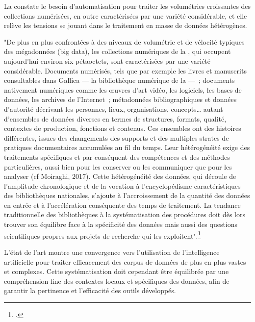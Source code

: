 La \bnf constate le besoin d'automatisation pour traiter les volumétries
croissantes des collections numérisées, en outre caractérisées par une
variété considérable, et elle relève les tensions se jouant dans le traitement en
masse de données hétérogènes.

\begin{kwote}

"De plus en plus confrontées à des niveaux de volumétrie et de vélocité
typiques des mégadonnées (big data), les collections numériques de la
\bnf, qui occupent aujourd'hui environ six pétaoctets, sont caractérisées
par une variété considérable. Documents numérisés, tels que par exemple
les livres et manuscrits consultables dans Gallica --- la bibliothèque
numérique de la \bnf ---~; documents nativement numériques comme les
œuvres d'art vidéo, les logiciels, les bases de données, les archives de
l'Internet~; métadonnées bibliographiques et données d'autorité
décrivant les personnes, lieux, organisations, concepts\ldots{} autant
d'ensembles de données diverses en termes de structures, formats,
qualité, contextes de production, fonctions et contenus. Ces ensembles
ont des histoires différentes, issues des changements des supports et
des multiples strates de pratiques documentaires accumulées au fil du
temps. Leur hétérogénéité exige des traitements spécifiques et par
conséquent des compétences et des méthodes particulières, aussi bien
pour les conserver ou les communiquer que pour les analyser (cf
Moiraghi, 2017). Cette hétérogénéité des données, qui découle de
l'amplitude chronologique et de la vocation à l'encyclopédisme
caractéristiques des bibliothèques nationales, s'ajoute à
l'accroissement de la quantité des données en entrée et à l'accélération
conséquente des temps de traitement. La tendance traditionnelle des
bibliothèques à la systématisation des procédures doit dès lors trouver
son équilibre face à la spécificité des données mais aussi des questions
scientifiques propres aux projets de recherche qui les
exploitent".\footcite[p.6]{bermes_patrimoine_2020}  
\end{kwote}

L'état de l'art montre une convergence vers l'utilisation de
l'intelligence artificielle pour traiter efficacement des corpus de
données de plus en plus vastes et complexes. Cette systématisation doit
cependant être équilibrée par une compréhension fine des contextes
locaux et spécifiques des données, afin de garantir la pertinence et
l'efficacité des outils développés.

